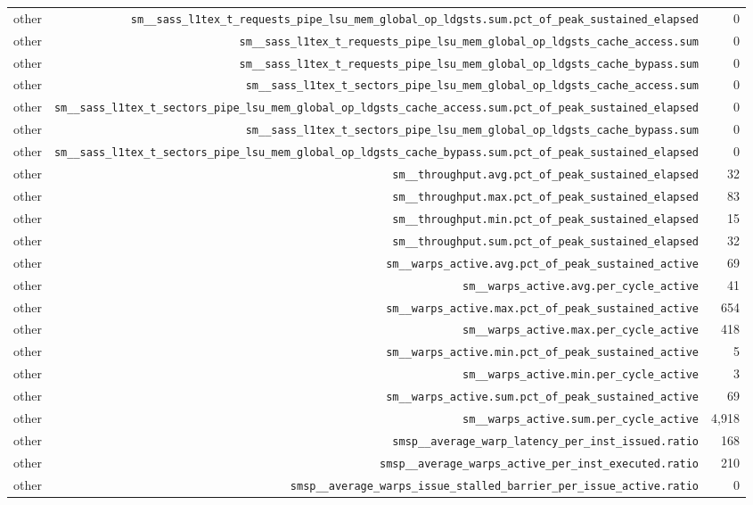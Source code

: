 \begin{table}[h]
\begin{tabular}{|l|r|r|}
other & \texttt{sm__sass_l1tex_t_requests_pipe_lsu_mem_global_op_ldgsts.sum.pct_of_peak_sustained_elapsed} & 0 \\
other & \texttt{sm__sass_l1tex_t_requests_pipe_lsu_mem_global_op_ldgsts_cache_access.sum} & 0 \\
other & \texttt{sm__sass_l1tex_t_requests_pipe_lsu_mem_global_op_ldgsts_cache_bypass.sum} & 0 \\
other & \texttt{sm__sass_l1tex_t_sectors_pipe_lsu_mem_global_op_ldgsts_cache_access.sum} & 0 \\
other & \texttt{sm__sass_l1tex_t_sectors_pipe_lsu_mem_global_op_ldgsts_cache_access.sum.pct_of_peak_sustained_elapsed} & 0 \\
other & \texttt{sm__sass_l1tex_t_sectors_pipe_lsu_mem_global_op_ldgsts_cache_bypass.sum} & 0 \\
other & \texttt{sm__sass_l1tex_t_sectors_pipe_lsu_mem_global_op_ldgsts_cache_bypass.sum.pct_of_peak_sustained_elapsed} & 0 \\
other & \texttt{sm__throughput.avg.pct_of_peak_sustained_elapsed} & 32 \\
other & \texttt{sm__throughput.max.pct_of_peak_sustained_elapsed} & 83 \\
other & \texttt{sm__throughput.min.pct_of_peak_sustained_elapsed} & 15 \\
other & \texttt{sm__throughput.sum.pct_of_peak_sustained_elapsed} & 32 \\
other & \texttt{sm__warps_active.avg.pct_of_peak_sustained_active} & 69 \\
other & \texttt{sm__warps_active.avg.per_cycle_active} & 41 \\
other & \texttt{sm__warps_active.max.pct_of_peak_sustained_active} & 654 \\
other & \texttt{sm__warps_active.max.per_cycle_active} & 418 \\
other & \texttt{sm__warps_active.min.pct_of_peak_sustained_active} & 5 \\
other & \texttt{sm__warps_active.min.per_cycle_active} & 3 \\
other & \texttt{sm__warps_active.sum.pct_of_peak_sustained_active} & 69 \\
other & \texttt{sm__warps_active.sum.per_cycle_active} & 4,918 \\
other & \texttt{smsp__average_warp_latency_per_inst_issued.ratio} & 168 \\
other & \texttt{smsp__average_warps_active_per_inst_executed.ratio} & 210 \\
other & \texttt{smsp__average_warps_issue_stalled_barrier_per_issue_active.ratio} & 0 \\

\end{tabular}
\end{table}
